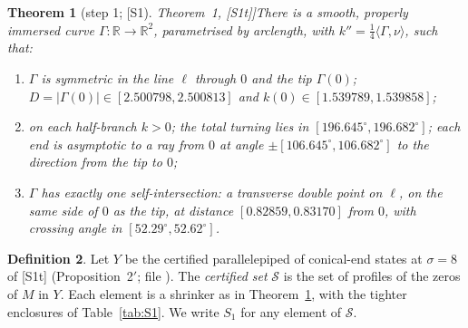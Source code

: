 \documentclass[11pt]{amsart}
\newtheorem{theorem}{Theorem}[section]
\theoremstyle{definition}
\newtheorem{definition}[theorem]{Definition}
\theoremstyle{remark}
\newcommand{\R}{\mathbb{R}}
\newcommand{\ip}[2]{\langle #1,#2\rangle}
\newcommand{\fn}[1]{\texttt{\detokenize{#1}}}
\newcommand{\dref}[1]{[\textsf{#1}]}
\newcommand{\Sset}{\mathcal S}
\begin{document}
\begin{theorem}[step 1; \dref{S1} Theorem~1, \dref{S1t}]\label{thm:S1}
There is a smooth, properly immersed curve $\Gamma:\R\to\R^2$, parametrised by arclength, with $k''=\frac14\ip\Gamma\nu$, such that:
\begin{enumerate}[label=\textup{(\alph*)},leftmargin=*,itemsep=1pt]
\item $\Gamma$ is symmetric in the line $\ell$ through $0$ and the tip $\Gamma(0)$; $D=|\Gamma(0)|\in[2.500798,2.500813]$ and $k(0)\in[1.539789,1.539858]$;
\item on each half-branch $k>0$; the total turning lies in $[196.645^\circ,196.682^\circ]$; each end is asymptotic to a ray from $0$ at angle $\pm[106.645^\circ,106.682^\circ]$ to the direction from the tip to $0$;
\item $\Gamma$ has exactly one self-intersection: a transverse double point on $\ell$, on the same side of $0$ as the tip, at distance $[0.82859,0.83170]$ from $0$, with crossing angle in $[52.29^\circ,52.62^\circ]$.
\end{enumerate}
\end{theorem}

\begin{definition}\label{def:Sset}
Let $Y$ be the certified parallelepiped of conical-end states at $\sigma=8$ of \dref{S1t} (Proposition~2$'$; file \fn{s1_tight/in_br2.txt}). The \emph{certified set} $\Sset$ is the set of profiles of the zeros of $M$ in $Y$. Each element is a shrinker as in Theorem~\ref{thm:S1}, with the tighter enclosures of Table~\ref{tab:S1}. We write $S_1$ for any element of $\Sset$.
\end{definition}
\end{document}
